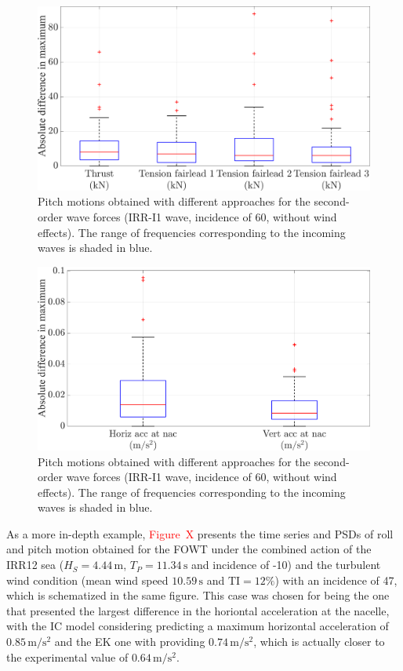 \begin{figure}[!hbtp]
	\centering
	\includegraphics[width=0.5\columnwidth]{./figures/ek_vs_ic-forces}	
	\caption{Pitch motions obtained with different approaches for the second-order wave forces (IRR-I1 wave, incidence of 60\textdegree{}, without wind effects). The range of frequencies corresponding to the incoming waves is shaded in blue.} \label{fig:exp_vs_num:impact_inclination:boxplot-forces}%
\end{figure}%

\begin{figure}[!hbtp]
	\centering
	\includegraphics[width=0.5\columnwidth]{./figures/ek_vs_ic-accs}
	\caption{Pitch motions obtained with different approaches for the second-order wave forces (IRR-I1 wave, incidence of 60\textdegree{}, without wind effects). The range of frequencies corresponding to the incoming waves is shaded in blue.} \label{fig:exp_vs_num:impact_inclination:boxplot-accs}%
\end{figure}%

As a more in-depth example, \textcolor{red}{Figure~X} presents the time series and PSDs of roll and pitch motion obtained for the FOWT under the combined action of the IRR12 sea ($H_S=4.44\,\text{m}$, $T_P = 11.34\,\text{s}$ and incidence of -10\textdegree{}) and the turbulent wind condition (mean wind speed $10.59\,\text{s}$ and $\textrm{TI}=12\%$) with an incidence of 47\textdegree{}, which is schematized in the same figure. This case was chosen for being the one that presented the largest difference in the horiontal acceleration at the nacelle, with the IC model considering predicting a maximum horizontal acceleration of $0.85\,\text{m}/\text{s}^2$ and the EK one with providing $0.74\,\text{m}/\text{s}^2$, which is actually closer to the experimental value of $0.64\,\text{m}/\text{s}^2$. 

